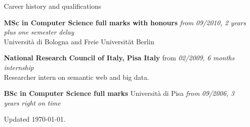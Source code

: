 \documentclass{resume}
\begin{document}
\begin{rSection}{Career history and qualifications}

		{\bf MSc in Computer Science full marks with honours} \hfill {\em from 09/2010, 2 years plus one semester delay} \\
		Universit\`a di Bologna and Freie Universit\"at Berlin 

		{\bf National Research Council of Italy, Pisa Italy} \hfill {from \em 02/2009, 6 months internship}\\
			Researcher intern on semantic web and big data.

		{\bf BSc in Computer Science full marks} Universit\`a di Pisa \hfill {\em from 09/2006, 3 years right on time} \\
	\end{rSection}
	\begin{rSection}{}
		Updated \today.
	\end{rSection}
\end{document}
